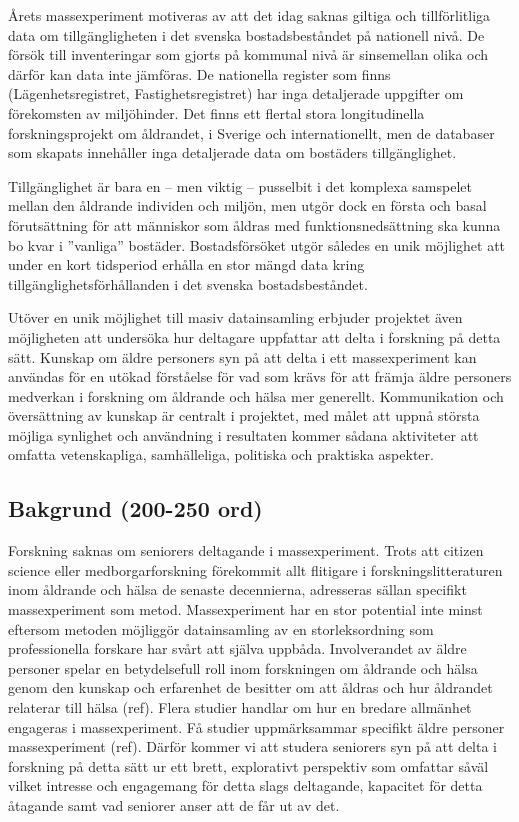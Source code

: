 \documentclass[]{tufte-handout}
\begin{document}
Årets massexperiment motiveras av att det idag saknas giltiga och
tillförlitliga data om tillgängligheten i det svenska bostadsbeståndet
på nationell nivå. De försök till inventeringar som gjorts på kommunal
nivå är sinsemellan olika och därför kan data inte jämföras. De
nationella register som finns (Lägenhetsregistret, Fastighetsregistret)
har inga detaljerade uppgifter om förekomsten av miljöhinder. Det finns
ett flertal stora longitudinella forskningsprojekt om åldrandet, i
Sverige och internationellt, men de databaser som skapats innehåller
inga detaljerade data om bostäders tillgänglighet.

Tillgänglighet är bara en -- men viktig -- pusselbit i det komplexa
samspelet mellan den åldrande individen och miljön, men utgör dock en
första och basal förutsättning för att människor som åldras med
funktionsnedsättning ska kunna bo kvar i ''vanliga'' bostäder.
Bostadsförsöket utgör således en unik möjlighet att under en kort
tidsperiod erhålla en stor mängd data kring tillgänglighetsförhållanden
i det svenska bostadsbeståndet.

Utöver en unik möjlighet till masiv datainsamling erbjuder projektet
även möjligheten att undersöka hur deltagare uppfattar att delta i
forskning på detta sätt. Kunskap om äldre personers syn på att delta i
ett massexperiment kan användas för en utökad förståelse för vad som
krävs för att främja äldre personers medverkan i forskning om åldrande
och hälsa mer generellt. Kommunikation och översättning av kunskap är
centralt i projektet, med målet att uppnå största möjliga synlighet och
användning i resultaten kommer sådana aktiviteter att omfatta
vetenskapliga, samhälleliga, politiska och praktiska aspekter.

\hypertarget{bakgrund-200-250-ord}{%
\subsection{Bakgrund (200-250 ord)}\label{bakgrund-200-250-ord}}

Forskning saknas om seniorers deltagande i massexperiment. Trots att
citizen science eller medborgarforskning förekommit allt flitigare i
forskningslitteraturen inom åldrande och hälsa de senaste decennierna,
adresseras sällan specifikt massexperiment som metod. Massexperiment har
en stor potential inte minst eftersom metoden möjliggör datainsamling av
en storleksordning som professionella forskare har svårt att själva
uppbåda. Involverandet av äldre personer spelar en betydelsefull roll
inom forskningen om åldrande och hälsa genom den kunskap och erfarenhet
de besitter om att åldras och hur åldrandet relaterar till hälsa (ref).
Flera studier handlar om hur en bredare allmänhet engageras i
massexperiment. Få studier uppmärksammar specifikt äldre personer
massexperiment (ref). Därför kommer vi att studera seniorers syn på att
delta i forskning på detta sätt ur ett brett, explorativt perspektiv som
omfattar såväl vilket intresse och engagemang för detta slags
deltagande, kapacitet för detta åtagande samt vad seniorer anser att de
får ut av det.
\end{document}
